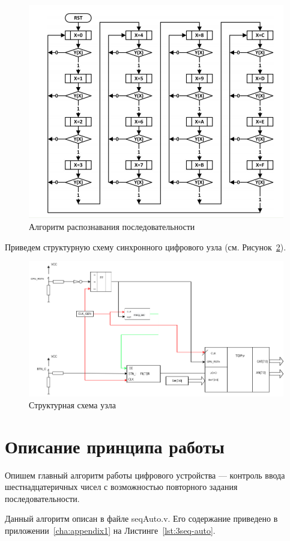 \begin{figure}[h!]
	\centering
	\includegraphics[width=0.68\linewidth]{course-plis/images/lab3/algorithm-pract3}
	\caption{Алгоритм распознавания последовательности}
	\label{fig:algorithm-pract3}
\end{figure}

Приведем структурную схему синхронного цифрового узла (см. Рисунок~\ref{fig:unit-pract3}).

\begin{figure}[h!]
	\centering
	\includegraphics[width=0.8\linewidth]{course-plis/images/lab3/unit-pract3}
	\caption{Структурная схема узла}
	\label{fig:unit-pract3}
\end{figure}


\section{Описание принципа работы}

Опишем главный алгоритм работы цифрового устройства --- контроль ввода шестнадцатеричных чисел с возможностью повторного задания последовательности.

Данный алгоритм описан в файле {seqAuto.v}. Его содержание приведено в приложении~\ref{cha:appendix1} на Листинге~\ref{lst:3seq-auto}.

